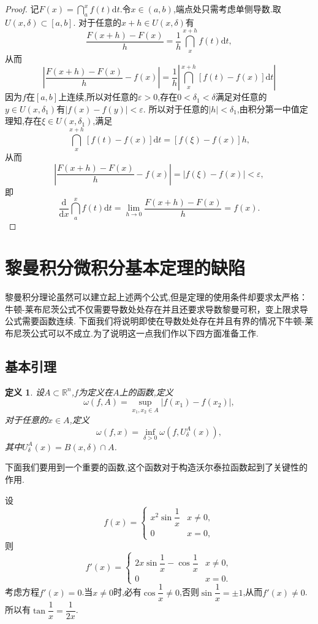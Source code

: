 \documentclass[a4paper,12pt]{article}
\newtheorem{definition}[theorem]{定义}
\begin{document}
{\begin{proof}
                记$F(x)=\dint_a^xf(t)\mathrm{d}t$.令$x\in(a,b)$,端点处只需考虑单侧导数.取$U(x,\delta)\subset[a,b]$.
                对于任意的$x+h\in U(x,\delta)$有$$\dfrac{F(x+h)-F(x)}{h}=\dfrac{1}{h}\dint_x^{x+h}f(t)\mathrm{d}t,$$
                从而$$\left|\dfrac{F(x+h)-F(x)}{h}-f(x)\right|=\dfrac{1}{h}\left|\dint_x^{x+h}[f(t)-f(x)]\mathrm{d}t\right|$$
                因为$f$在$[a,b]$上连续,所以对任意的$\varepsilon>0$,存在$0<\delta_1<\delta$满足对任意的$y\in U(x,\delta_1)$有$|f(x)-f(y)|<\varepsilon$.
                所以对于任意的$|h|<\delta_1$,由积分第一中值定理知,存在$\xi\in U(x,\delta_1)$,满足
                $$\dint_x^{x+h}[f(t)-f(x)]\mathrm{d}t=[f(\xi)-f(x)]h,$$从而 
                $$\left|\dfrac{F(x+h)-F(x)}{h}-f(x)\right|=|f(\xi)-f(x)|<\varepsilon,$$
                即$$\dfrac{\mathrm{d}}{\mathrm{d}x}\dint_a^xf(t)\mathrm{d}t=\lim_{h\to 0}\dfrac{F(x+h)-F(x)}{h}=f(x).$$
            \end{proof}

        \section{黎曼积分微积分基本定理的缺陷}
            黎曼积分理论虽然可以建立起上述两个公式,但是定理的使用条件却要求太严格：牛顿-莱布尼茨公式不仅需要导数处处存在并且还要求导数黎曼可积，变上限求导公式需要函数连续.
            下面我们将说明即使在导数处处存在并且有界的情况下牛顿-莱布尼茨公式可以不成立.为了说明这一点我们作以下四方面准备工作.
            \subsection{基本引理}
                \begin{definition}
                    设$A\subset\mathbb{R}^n$,$f$为定义在$A$上的函数,定义$$\omega(f,A)=\sup_{x_1,x_2\in A}|f(x_1)-f(x_2)|,$$
                    对于任意的$x\in A$,定义$$\omega(f,x)=\inf_{\delta>0}\omega(f,U_\delta^A(x)),$$
                    其中$U_\delta^A(x)=B(x,\delta)\cap A$.
                \end{definition}
                下面我们要用到一个重要的函数,这个函数对于构造沃尔泰拉函数起到了关键性的作用.

                设$$f(x)=\begin{cases}
                    x^2\sin\dfrac{1}{x} &x\not=0,\\
                    0 &x=0,
                \end{cases}$$
                则$$f'(x)=\begin{cases}
                    2x\sin\dfrac{1}{x}-\cos\dfrac{1}{x} &x\not=0,\\
                    0 &x=0.
                \end{cases}$$
                考虑方程$f'(x)=0$.当$x\not=0$时,必有$\cos\dfrac{1}{x}\not=0$,否则$\sin\dfrac{1}{x}=\pm 1$,从而$f'(x)\not=0$.所以有$\tan\dfrac{1}{x}=\dfrac{1}{2x}$.

}
\end{document}
